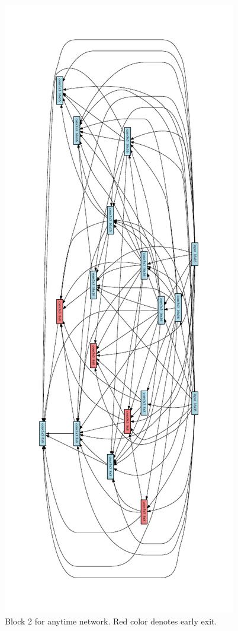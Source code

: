 \begin{figure}[h]
\else
\begin{center}
\includegraphics[width=0.6\linewidth]{figures/graph_642261663860860599_cell_1.pdf}
\end{center}
\fi
\caption{Block 2 for anytime network. Red color denotes early exit.}
\label{fig:best_anytime2}
\end{figure}


